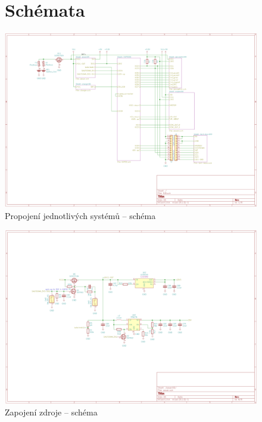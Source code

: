 \begin{figure}
	\section{Schémata}
    \vspace{\OdsazeniNadpisu}
    \centering
    \includegraphics[width=0.93\textheight, angle=90]{kapitoly/ctvrta_elektronicka_varianta/E4_zapojeni/B.B.pdf}
    \caption{Propojení jednotlivých systémů -- schéma}
    \label{fig:E4-sch_B.B}
\end{figure}
\begin{figure}
    \centering
    \includegraphics[width=0.93\textheight, angle=90]{kapitoly/ctvrta_elektronicka_varianta/E4_zapojeni/zdroj.pdf}
    \caption{Zapojení zdroje -- schéma}
    \label{fig:E4-sch_zdroj}
\end{figure}
